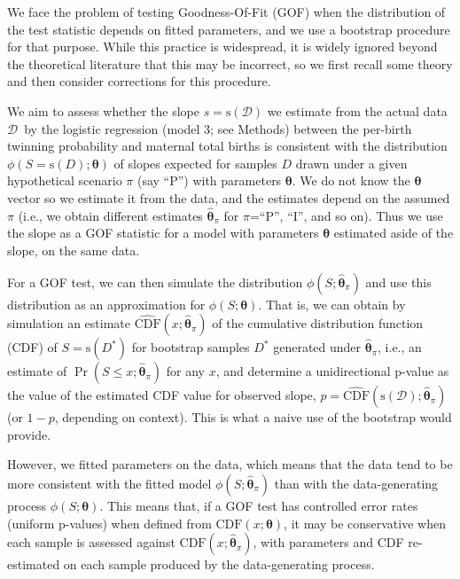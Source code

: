\documentclass[a4paper]{article}\usepackage[]{graphicx}\usepackage[]{color}
\newcommand{\adata}{\ensuremath{\mathcal{D}}}
\newcommand{\data}{\ensuremath{D}}
\newcommand{\CDF}{\ensuremath{\mathrm{CDF}}}
\newcommand{\sfn}{\ensuremath{\mathrm{s}}}
\newcommand{\bth}{\ensuremath{\boldsymbol{\theta}}}
\begin{document}
We face the problem of testing Goodness-Of-Fit (GOF) when the distribution of the test statistic depends on fitted parameters, and we use a bootstrap procedure for that purpose. While this practice is widespread, it is widely ignored beyond the theoretical literature that this may be incorrect, so we first recall some theory and then consider corrections for this procedure.

We aim to assess whether the slope $s=\sfn(\adata)$ we estimate from the actual data \adata\ by the logistic regression (model 3; see Methods) between the per-birth twinning probability and maternal total births is consistent with the distribution $\phi(S=\sfn(\data) ; \bth)$ of slopes expected for samples $\data$ drawn under a given hypothetical scenario $\pi$ (say ``P'') with parameters $\bth$. We do not know the $\bth$ vector so we estimate it from the data, and the estimates  depend on the assumed $\pi$ (i.e., we obtain different estimates $\hat{\bth}_\pi$ for $\pi$=``P'', ``I'', and so on). Thus we use the slope as a GOF statistic for a model with parameters $\bth$ estimated aside of the slope, on the same data.

For a GOF test, we can then simulate the distribution $\phi(S;\hat{\bth}_\pi)$ and use this distribution as an approximation for $\phi(S; \bth)$. That is, we can obtain by simulation an estimate $\hat{\CDF}(x;\hat{\bth}_\pi)$ of the cumulative distribution function (CDF) of $S=\sfn(\data^*)$ for bootstrap samples $\data^*$ generated under $\hat{\bth}_\pi$, i.e., an estimate of $\Pr(S\leq x; \hat{\bth}_\pi)$ for any $x$, and determine a unidirectional p-value as the value of the estimated CDF value for observed slope, $p=\hat{\CDF}(\sfn(\adata) ;\hat{\bth}_\pi)$ (or $1-p$, depending on context). This is what a naive use of the bootstrap would provide.

However, we fitted parameters on the data, which means that the data tend to be more consistent with the fitted model $\phi(S;\hat{\bth}_\pi)$ than with the data-generating process $\phi(S; \bth)$. This means that, if a GOF test has controlled error rates (uniform p-values) when defined from $\CDF(x;\bth)$, it may be conservative when each sample is assessed against  $\CDF(x;\hat{\bth}_\pi)$, with parameters and CDF re-estimated on each sample produced by the data-generating process.
\end{document}
